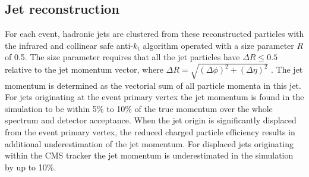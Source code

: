 \subsection{Jet reconstruction}

For each event, hadronic jets are clustered from these reconstructed particles with the infrared and collinear safe
 anti-$k_\mathrm{t}$ algorithm 
operated with a size parameter $R$ of 0.5. The size parameter requires that all the jet 
particles have $\Delta R \leq 0.5$ relative to the jet momentum vector, where
 $\Delta R=\sqrt{(\Delta\phi)^2 + (\Delta\eta)^2}$ \cite{Cacciari:2008gp}. 
The jet momentum is determined as the vectorial sum of all particle momenta in this jet.
For jets originating at the event primary vertex the jet momentum is found in the simulation to be within 5\% to 10\% of the true momentum over 
the whole \pt spectrum and detector acceptance. 
When the jet origin is significantly displaced from the event primary vertex, the reduced 
charged particle efficiency results in additional underestimation of the jet momentum. 
For displaced jets originating within the CMS tracker the jet momentum is underestimated in the simulation by up to 10\%.

